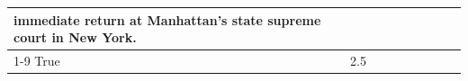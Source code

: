 \begin{table}[H]
\begin{tabular}{lllrlllll}
immediate return at Manhattan’s state supreme court in New York.   \\
\cline{1-9}
True & 2.5%

\end{tabular}
\end{table}
